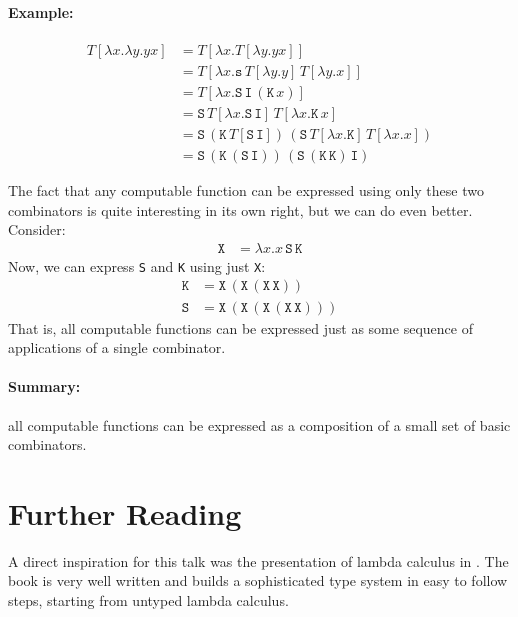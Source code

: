 \documentclass[11pt,twoside,a4paper]{article} %
\newcommand{\sym}[1]{\texttt{#1}}
\newcommand{\msym}[1]{\mathtt{#1}}
\begin{document}
\paragraph{Example:}
\begin{align*}
T[\lambda x.\lambda y.yx] &= T[\lambda x.T[\lambda y.yx]] \\
                          &= T[\lambda x.\msym{s}\,T[\lambda y.y]\,T[\lambda y.x]]
                          \\
                          &= T[\lambda x.\msym{S}\,\msym{I}\,(\msym{K}\,x)] \\
                          &= \msym{S}\,T[\lambda x.\msym{S}\,\msym{I}]\,T[
                          \lambda x.\msym{K}\,x] \\
                          &= \msym{S}\,(\msym{K}\,T[\msym{S}\,\msym{I}])\,(\msym
                          {S}\,T[\lambda x.\msym{K}]\,T[\lambda x.x]) \\
                          &= \msym{S}\,(\msym{K}\,(\msym{S}\,\msym{I}))\,(\msym{
                          S}\,(\msym{K}\,\msym{K})\,\msym{I})
\end{align*}

The fact that any computable function can be expressed using only these two
combinators is quite interesting in its own right, but we can do even better. 
Consider:
\begin{align*}
\msym{X} &= \lambda x.x\,\msym{S}\,\msym{K}
\end{align*}
Now, we can express \sym{S} and \sym{K} using just \sym{X}:
\begin{align*}
\msym{K} &= \msym{X}\,(\msym{X}\,(\msym{X}\,\msym{X})) \\
\msym{S} &= \msym{X}\,(\msym{X}\,(\msym{X}\,(\msym{X}\,\msym{X})))
\end{align*}
That is, all computable functions can be expressed just as some sequence of
applications of a single combinator.

\paragraph{Summary:} all computable functions can be expressed as a composition 
of a small set of basic combinators.

\section{Further Reading}

A direct inspiration for this talk was the presentation of lambda calculus in
\cite{TAPL}. The book is very well written and builds a sophisticated type
system in easy to follow steps, starting from untyped lambda calculus. 
\end{document}
